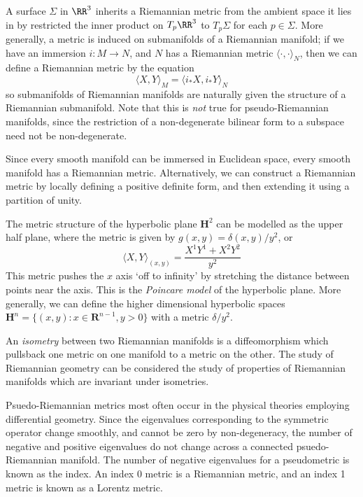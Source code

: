 \begin{example}
    A surface $\Sigma$ in $\RR^3$ inherits a Riemannian metric from the ambient space it lies in by restricted the inner product on $T_p \RR^3$ to $T_p \Sigma$ for each $p \in \Sigma$. More generally, a metric is induced on submanifolds of a Riemannian manifold; if we have an immersion $i: M \to N$, and $N$ has a Riemannian metric $\langle \cdot, \cdot \rangle_N$, then we can define a Riemannian metric by the equation
    \[ \langle X, Y \rangle_M = \langle i_*X, i_*Y \rangle_N \]
    so submanifolds of Riemannian manifolds are naturally given the structure of a Riemannian submanifold. Note that this is \emph{not} true for pseudo-Riemannian manifolds, since the restriction of a non-degenerate bilinear form to a subspace need not be non-degenerate.

    Since every smooth manifold can be immersed in Euclidean space, every smooth manifold has a Riemannian metric. Alternatively, we can construct a Riemannian metric by locally defining a positive definite form, and then extending it using a partition of unity.
\end{example}

\begin{example}
    The metric structure of the hyperbolic plane $\mathbf{H}^2$ can be modelled as the upper half plane, where the metric is given by $g(x,y) = \delta(x,y)/y^2$, or
    \[ \langle X, Y \rangle_{(x,y)} = \frac{X^1Y^1 + X^2Y^2}{y^2} \]
    This metric pushes the $x$ axis `off to infinity' by stretching the distance between points near the axis. This is the \emph{Poincare model} of the hyperbolic plane. More generally, we can define the higher dimensional hyperbolic spaces $\mathbf{H}^n = \{ (x,y): x \in \mathbf{R}^{n-1}, y > 0 \}$ with a metric $\delta/y^2$.
\end{example}

An \emph{isometry} between two Riemannian manifolds is a diffeomorphism which pullsback one metric on one manifold to a metric on the other. The study of Riemannian geometry can be considered the study of properties of Riemannian manifolds which are invariant under isometries.

Psuedo-Riemannian metrics most often occur in the physical theories employing differential geometry. Since the eigenvalues corresponding to the symmetric operator change smoothly, and cannot be zero by non-degeneracy, the number of negative and positive eigenvalues do not change across a connected psuedo-Riemannian manifold. The number of negative eigenvalues for a pseudometric is known as the index. An index 0 metric is a Riemannian metric, and an index 1 metric is known as a Lorentz metric.

